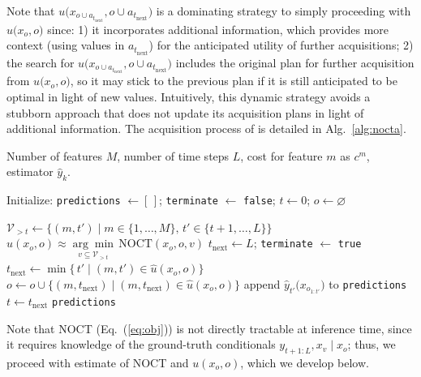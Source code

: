 Note that $u\bigl({x}_{o \cup a_{t_{\text{next}}}}, o \cup a_{t_{\text{next}}}\bigr)$ is a dominating strategy to simply proceeding with $u\bigl(x_o, o\bigr)$ since: 1) it incorporates additional information, which provides more context (using values in $a_{t_{\text{next}}}$) for the anticipated utility of further acquisitions; 2) the search for $u\bigl({x}_{o \cup a_{t_{\text{next}}}}, o \cup a_{t_{\text{next}}}\bigr)$ includes the original plan for further acquisition from $u\bigl(x_o, o\bigr)$, so it may stick to the previous plan if it is still anticipated to be optimal in light of new values. Intuitively, this dynamic strategy avoids a stubborn approach that does not update its acquisition plans in light of additional information. The acquisition process of \texttt{\OurMethod} is detailed in Alg.~\ref{alg:nocta}.

\begin{algorithm}[htp]
    \footnotesize
  \caption{\texttt{\OurMethod} \label{alg:nocta}}
  \begin{algorithmic}[1]
    \Require Number of features $M$, number of time steps $L$, cost for feature $m$ as $c^m$, estimator $\hat y_{k}$.

    \State Initialize: \texttt{predictions} $\gets [\,]$; \texttt{terminate} $\gets$ \texttt{false}; $t \gets 0$; $o \gets \varnothing$
    
    \State $\mathcal{V}_{>t} \! \gets\!  \{(m,t') \! \mid \! m\in\{1,\ldots,M\},\,t'\in\{t+1,\ldots,L\}\}$
      \State $\hat u(x_o,o)\approx
    \underset{v \subseteq  \mathcal{V}_{>t}} {\arg\!\min}\,\mathrm{NOCT}(x_o, o, v)$ 
        \State $t_{\text{next} }\gets L$; \texttt{terminate} $\gets$ 
        \texttt{true}
      \Else
        \State $t_{\text{next}}\gets\min\{\,t'\mid(m,t')\in\hat u(x_o,o)\}$
        \State $o\gets o\cup\{(m,t_{\text{next}})\mid(m,t_{\text{next}})\in\hat u(x_o,o)\}$
      \EndIf
          \State append $\hat{y} _{t'}\bigl(x_{o_{1:t'}}\bigr)$ to \texttt{predictions}
        \EndFor
        \State $t \gets t_{\text{next}}$
%
    \EndWhile
    \State \Return \texttt{predictions}
  \end{algorithmic}
\end{algorithm}

Note that NOCT (Eq.~(\ref{eq:obj})) is not directly tractable at inference time, since it requires knowledge of the ground-truth conditionals $y_{t+1:L}, x_v \mid {x}_{o}$; thus, we proceed with estimate of NOCT and $u(x_o, o)$, which we develop below. 

